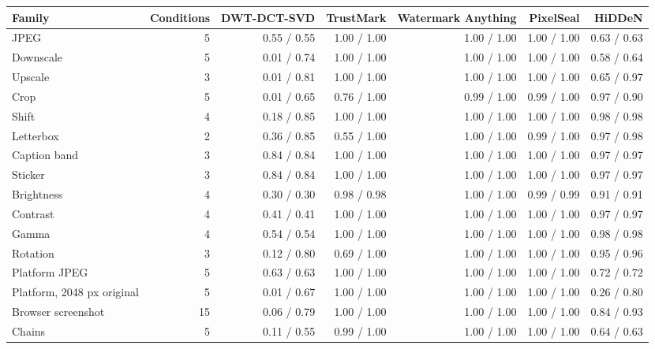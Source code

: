 \begin{tabular}{lrrrrrr}
\toprule
Family & Conditions & DWT-DCT-SVD & TrustMark & Watermark Anything & PixelSeal & HiDDeN \\
\midrule
JPEG & 5 & 0.55 / 0.55 & 1.00 / 1.00 & 1.00 / 1.00 & 1.00 / 1.00 & 0.63 / 0.63 \\
Downscale & 5 & 0.01 / 0.74 & 1.00 / 1.00 & 1.00 / 1.00 & 1.00 / 1.00 & 0.58 / 0.64 \\
Upscale & 3 & 0.01 / 0.81 & 1.00 / 1.00 & 1.00 / 1.00 & 1.00 / 1.00 & 0.65 / 0.97 \\
Crop & 5 & 0.01 / 0.65 & 0.76 / 1.00 & 0.99 / 1.00 & 0.99 / 1.00 & 0.97 / 0.90 \\
Shift & 4 & 0.18 / 0.85 & 1.00 / 1.00 & 1.00 / 1.00 & 1.00 / 1.00 & 0.98 / 0.98 \\
Letterbox & 2 & 0.36 / 0.85 & 0.55 / 1.00 & 1.00 / 1.00 & 0.99 / 1.00 & 0.97 / 0.98 \\
Caption band & 3 & 0.84 / 0.84 & 1.00 / 1.00 & 1.00 / 1.00 & 1.00 / 1.00 & 0.97 / 0.97 \\
Sticker & 3 & 0.84 / 0.84 & 1.00 / 1.00 & 1.00 / 1.00 & 1.00 / 1.00 & 0.97 / 0.97 \\
Brightness & 4 & 0.30 / 0.30 & 0.98 / 0.98 & 1.00 / 1.00 & 0.99 / 0.99 & 0.91 / 0.91 \\
Contrast & 4 & 0.41 / 0.41 & 1.00 / 1.00 & 1.00 / 1.00 & 1.00 / 1.00 & 0.97 / 0.97 \\
Gamma & 4 & 0.54 / 0.54 & 1.00 / 1.00 & 1.00 / 1.00 & 1.00 / 1.00 & 0.98 / 0.98 \\
Rotation & 3 & 0.12 / 0.80 & 0.69 / 1.00 & 1.00 / 1.00 & 1.00 / 1.00 & 0.95 / 0.96 \\
Platform JPEG & 5 & 0.63 / 0.63 & 1.00 / 1.00 & 1.00 / 1.00 & 1.00 / 1.00 & 0.72 / 0.72 \\
Platform, 2048 px original & 5 & 0.01 / 0.67 & 1.00 / 1.00 & 1.00 / 1.00 & 1.00 / 1.00 & 0.26 / 0.80 \\
Browser screenshot & 15 & 0.06 / 0.79 & 1.00 / 1.00 & 1.00 / 1.00 & 1.00 / 1.00 & 0.84 / 0.93 \\
Chains & 5 & 0.11 / 0.55 & 0.99 / 1.00 & 1.00 / 1.00 & 1.00 / 1.00 & 0.64 / 0.63 \\
\bottomrule
\end{tabular}
